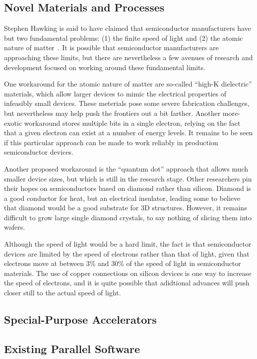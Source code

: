 \subsection{Novel Materials and Processes}
\label{sec:cpu:Novel Materials and Processes}

Stephen Hawking is said to have claimed that semiconductor manufacturers
have but two fundamental problems: (1) the finite speed of light and
(2) the atomic nature of matter~\cite{BryanGardiner2007}.
It is possible that semiconductor manufacturers are approaching these
limits, but there are nevertheless a few avenues of research and
development focused on working around these fundamental limits.

One workaround for the atomic nature of matter are so-called
``high-K dielectric'' materials, which allow larger devices to mimic the
electrical properties of infeasibly small devices.
These meterials pose some severe fabrication challenges, but nevertheless
may help push the frontiers out a bit farther.
Another more-exotic workaround stores multiple bits in a single electron,
relying on the fact that a given electron can exist at a number of
energy levels.
It remains to be seen if this particular approach can be made to work
reliably in production semiconductor devices.

Another proposed workaround is the ``quantum dot'' approach that
allows much smaller device sizes, but which is still in the research
stage.
Other researchers pin their hopes on semiconductors based on diamond
rather than silicon.
Diamond is a good conductor for heat, but an electrical insulator,
leading some to believe that diamond would be a good substrate for
3D structures.
However, it remains difficult to grow large single diamond crystals,
to say nothing of slicing them into wafers.

Although the speed of light would be a hard limit, the fact is that
semiconductor devices are limited by the speed of electrons rather
than that of light, given that electrons move at between 3\% and 30\%
of the speed of light in semiconductor materials.
The use of copper connections on silicon devices is one way to increase
the speed of electrons, and it is quite possible that adidtional
advances will push closer still to the actual speed of light.

\subsection{Special-Purpose Accelerators}
\label{sec:cpu:Special-Purpose Accelerators}

\subsection{Existing Parallel Software}
\label{sec:cpu:Existing Parallel Software}
